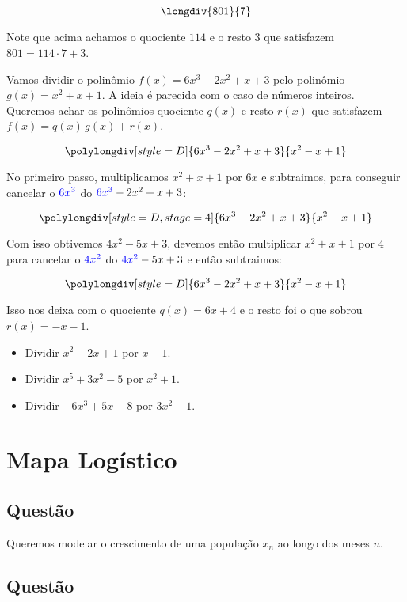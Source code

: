 \documentclass[a4paper,fleqn,12pt]{article}
\begin{document}
$$\longdiv{801}{7}$$

Note que acima achamos o quociente $114$ e o resto $3$ que satisfazem $801 = 114 \cdot 7 + 3$.

\n\n

Vamos dividir o polinômio $f(x) = 6x^3 - 2x^2 + x + 3$ pelo polinômio $g(x) = x^2 + x + 1$. A ideia é parecida com o caso de números inteiros. Queremos achar os polinômios quociente $q(x)$ e resto $r(x)$ que satisfazem $f(x) = q(x) \, g(x) + r(x)$.

$$\polylongdiv[style=D]{6x^3-2x^2+x+3}{x^2-x+1}$$

No primeiro passo, multiplicamos $x^2 + x + 1$ por $\boxed{6x}$ e subtraimos, para conseguir cancelar o $\textcolor{blue}{6x^3}$ do $\textcolor{blue}{6x^3} - 2x^2 + x + 3$:

$$\polylongdiv[style=D, stage=4]{6x^3-2x^2+x+3}{x^2-x+1}$$

Com isso obtivemos $4x^2 - 5x + 3$, devemos então multiplicar $x^2 + x + 1$ por $\boxed{4}$ para cancelar o $\textcolor{blue}{4x^2}$ do $\textcolor{blue}{4x^2} - 5x + 3$ e então subtraimos:

$$\polylongdiv[style=D]{6x^3-2x^2+x+3}{x^2-x+1}$$

Isso nos deixa com o quociente $\boxed{q(x) = 6x + 4}$ e o resto foi o que sobrou $r(x) = - x - 1$.

\begin{itemize}
\item Dividir $x^2 - 2x + 1$ por $x - 1$.
\item Dividir $x^5 + 3x^2 - 5$ por $x^2 + 1$.
\item Dividir $-6x^3 + 5x - 8$ por $3x^2 - 1$.
\end{itemize}


\pagebreak

\section{Mapa Logístico}

\subsection{Questão}

Queremos modelar o crescimento de uma população $x_n$ ao longo dos meses $n$.

\subsection{Questão}
\end{document}
